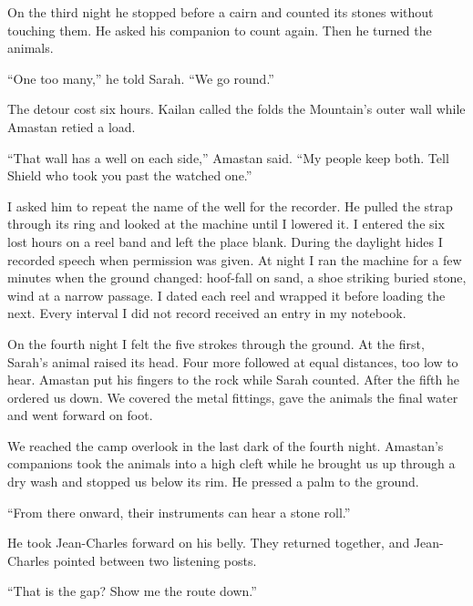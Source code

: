 On the third night he stopped before a cairn and counted its stones without touching them. He asked his companion to count again. Then he turned the animals.\par

``One too many,'' he told Sarah. ``We go round.''\par

The detour cost six hours. Kailan called the folds the Mountain's outer wall while Amastan retied a load.\par

``That wall has a well on each side,'' Amastan said. ``My people keep both. Tell Shield who took you past the watched one.''\par

I asked him to repeat the name of the well for the recorder. He pulled the strap through its ring and looked at the machine until I lowered it. I entered the six lost hours on a reel band and left the place blank. During the daylight hides I recorded speech when permission was given. At night I ran the machine for a few minutes when the ground changed: hoof-fall on sand, a shoe striking buried stone, wind at a narrow passage. I dated each reel and wrapped it before loading the next. Every interval I did not record received an entry in my notebook.\par

On the fourth night I felt the five strokes through the ground. At the first, Sarah's animal raised its head. Four more followed at equal distances, too low to hear. Amastan put his fingers to the rock while Sarah counted. After the fifth he ordered us down. We covered the metal fittings, gave the animals the final water and went forward on foot.\par

\ornament

We reached the camp overlook in the last dark of the fourth night. Amastan's companions took the animals into a high cleft while he brought us up through a dry wash and stopped us below its rim. He pressed a palm to the ground.\par

``From there onward, their instruments can hear a stone roll.''\par

He took Jean-Charles forward on his belly. They returned together, and Jean-Charles pointed between two listening posts.\par

``That is the gap? Show me the route down.''\par

